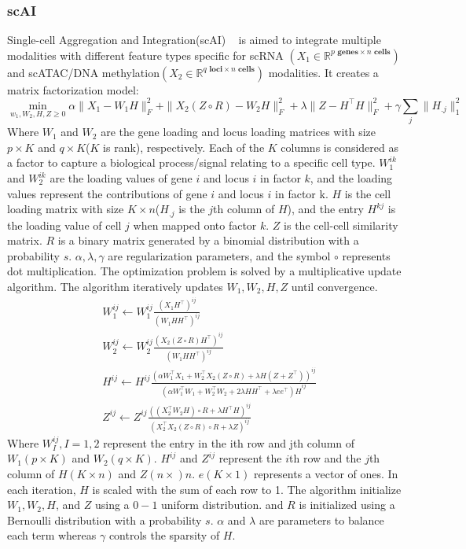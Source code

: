 \subsubsection{scAI}
Single-cell Aggregation and Integration(scAI) ~\citep{jin2020scai} is aimed to integrate multiple modalities with different feature types specific for scRNA $(X_1\in \mathbb{R}^{p \textbf{ genes} \times n \textbf{ cells}})$ and scATAC/DNA methylation$(X_2\in \mathbb{R}^{q \textbf{ loci}\times n \textbf{ cells}})$ modalities. It creates a matrix factorization model:
\begin{equation}
\min_{w_1,W_2,H,Z\geq 0} \alpha \|X_1-W_1H\|_F^2 + \|X_2(Z \circ R)-W_2H\|_F^2 + \lambda \|Z-H^\top H\|_F^2 + \gamma\sum_j \|H_{.j}\|_1^2
\end{equation}
Where $W_1$ and $W_2$ are the gene loading and locus loading matrices with size $p\times K$ and $q\times K$($K$ is rank), respectively. Each of the $K$ columns is considered as a factor to capture a biological process/signal relating to a specific cell type. $W_1^{ik}$ and $W_2^{ik}$ are the loading values of gene $i$ and locus $i$ in factor $k$, and the loading values represent the contributions of gene $i$ and locus $i$ in factor k. $H$ is the cell loading matrix with size $K\times n$($H_{.j}$ is the $j$th column of $H$), and the entry $H^{kj}$ is the loading value of cell $j$ when mapped onto factor $k$. $Z$ is the cell-cell similarity matrix. $R$ is a binary matrix generated by a binomial distribution with a probability $s$. $\alpha, \lambda, \gamma$ are regularization parameters, and the symbol $\circ$ represents dot multiplication.
The optimization problem is solved by a multiplicative update algorithm. The algorithm iteratively updates $W_1, W_2, H, Z$ until convergence. 
\begin{equation}
	\begin{aligned}
	&W_1^{ij} \leftarrow W_1^{ij} \frac{{(X_1 H^\top)}^{ij}}{{(W_1 H H^\top)}^{ij} } \\
	&W_2^{ij} \leftarrow W_2^{ij} \frac{{(X_2(Z \circ R)H^\top)}^{ij}}{{(W_1 H H^\top)}^{ij}} \\
	&H^{ij} \leftarrow H^{ij} \frac{{(\alpha W_1^\top X_1 + W_2^\top X_2 (Z\circ R) + \lambda H(Z+Z^\top))}^{ij}}{{(\alpha W_1^\top W_1 + W_2^\top W_2 + 2 \lambda H H ^\top + \lambda e e^\top )H}^{ij}} \\
	&Z^{ij} \leftarrow Z^{ij} \frac{{((X_2^\top W_2 H)\circ R + \lambda H^\top H)}^{ij}}{{(X_2^\top X_2(Z\circ R) \circ R + \lambda Z)}^{ij}}
	\end{aligned}
\end{equation}
Where $W_I^{ij}, I = 1,2$ represent the entry in the ith row and jth column of $W_1(p\times K)$ and $W_2(q\times K)$. $H^{ij}$ and $Z^{ij}$ represent the $i$th row and the $j$th column of $H(K\times n)$ and $Z(n\times) n$. $e(K\times 1)$ represents a vector of ones. In each iteration, $H$ is scaled with the sum of each row to 1. The algorithm initialize $W_1, W_2,H$, and $Z$ using a $0-1$ uniform distribution. and $R$ is initialized using a Bernoulli distribution with a probability $s$. $\alpha$ and $\lambda$ are parameters to balance each term whereas $\gamma$ controls the sparsity of $H$.

